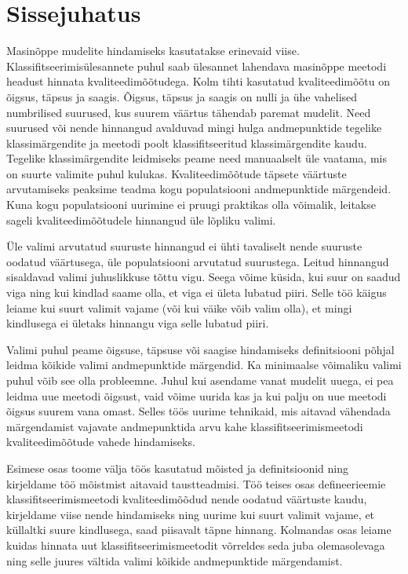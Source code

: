 \section{Sissejuhatus}
Masinõppe mudelite hindamiseks kasutatakse erinevaid viise. Klassifitseerimisülesannete puhul saab ülesannet lahendava masinõppe meetodi headust hinnata kvaliteedimõõtudega. Kolm tihti kasutatud kvaliteedimõõtu on õigsus, täpsus ja saagis. Õigsus, täpsus ja saagis on nulli ja ühe vahelised numbrilised suurused, kus suurem väärtus tähendab paremat mudelit. Need suurused või nende hinnangud avalduvad mingi hulga andmepunktide tegelike klassimärgendite ja meetodi poolt klassifitseeritud klassimärgendite kaudu. Tegelike klassimärgendite leidmiseks peame need manuaalselt üle vaatama, mis on suurte valimite puhul kulukas. Kvaliteedimõõtude täpsete väärtuste arvutamiseks peaksime teadma kogu populatsiooni andmepunktide märgendeid. Kuna kogu populatsiooni uurimine ei pruugi praktikas olla võimalik, leitakse sageli kvaliteedimõõtudele hinnangud üle lõpliku valimi.

Üle valimi arvutatud suuruste hinnangud ei ühti tavaliselt nende suuruste oodatud väärtusega, üle populatsiooni arvutatud suurustega. Leitud hinnangud sisaldavad valimi juhuslikkuse tõttu vigu. Seega võime küsida, kui suur on saadud viga ning kui kindlad saame olla, et viga ei ületa lubatud piiri. Selle töö käigus leiame kui suurt valimit vajame (või kui väike võib valim olla), et mingi kindlusega ei ületaks hinnangu viga selle lubatud piiri.

Valimi puhul peame õigsuse, täpsuse või saagise hindamiseks definitsiooni põhjal leidma kõikide valimi andmepunktide märgendid. Ka minimaalse võimaliku valimi puhul võib see olla probleemne. Juhul kui asendame vanat mudelit uuega, ei pea leidma uue meetodi õigsust, vaid võime uurida kas ja kui palju on uue meetodi õigsus suurem vana omast. Selles töös uurime tehnikaid, mis aitavad vähendada märgendamist vajavate andmepunktida arvu kahe klassifitseerimismeetodi kvaliteedimõõtude vahede hindamiseks.

Esimese osas toome välja töös kasutatud mõisted ja definitsioonid ning kirjeldame töö mõistmist aitavaid taustteadmisi. Töö teises osas defineerieemie klassifitseerimismeetodi kvaliteedimõõdud nende oodatud väärtuste kaudu, kirjeldame viise nende hindamiseks ning uurime kui suurt valimit vajame, et küllaltki suure kindlusega, saad piisavalt täpne hinnang. Kolmandas osas leiame kuidas hinnata uut klassifitseerimismeetodit võrreldes seda juba olemasolevaga ning selle juures vältida valimi kõikide andmepunktide märgendamist.